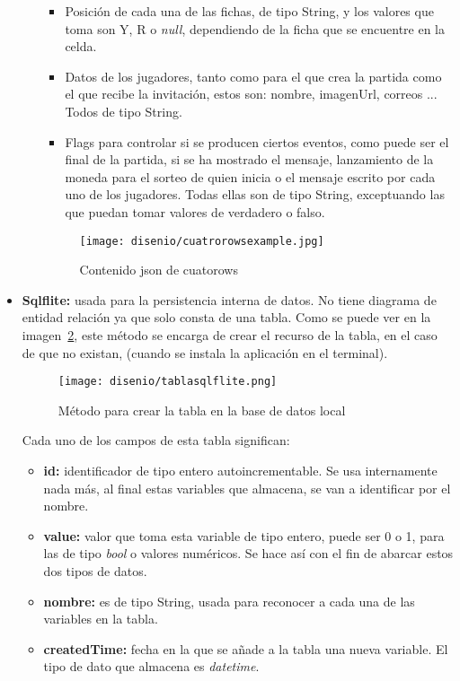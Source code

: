 \begin{itemize}
\begin{itemize}
		\begin{itemize}
			\item Posición de cada una de las fichas, de tipo String, y los valores que toma son Y, R o \emph{null}, dependiendo de la ficha que se encuentre en la celda.
			\item Datos de los jugadores, tanto como para el que crea la partida como el que recibe la invitación, estos son: nombre, imagenUrl, correos ... Todos de tipo String.
			\item Flags para controlar si se producen ciertos eventos, como puede ser el final de la partida, si se ha mostrado el mensaje, lanzamiento de la moneda para el sorteo de quien inicia o el mensaje escrito por cada uno de los jugadores. Todas ellas son de tipo String, exceptuando las que puedan tomar valores de verdadero o falso.
		\end{itemize}
	
		\begin{figure}[H]
			\centering
			\texttt{[image: disenio/cuatrorowsexample.jpg]}
			\caption{Contenido json de cuatorows}\label{fig:cuatrorowsexample}
		\end{figure}
	\end{itemize}
	
	\item \textbf{Sqlflite:} usada para la persistencia interna de datos. No tiene diagrama de entidad relación ya que solo consta de una tabla. Como se puede ver en la imagen~\ref{fig:tablasqlflite}, este método se encarga de crear el recurso de la tabla, en el caso de que no existan, (cuando se instala la aplicación en el terminal).
	
	\begin{figure}[H]
		\centering
		\texttt{[image: disenio/tablasqlflite.png]}
		\caption{Método para crear la tabla en la base de datos local}\label{fig:tablasqlflite}
	\end{figure}

	Cada uno de los campos de esta tabla significan:
	\begin{itemize}
		\item \textbf{id:} identificador de tipo entero autoincrementable. Se usa internamente nada más, al final estas variables que almacena, se van a identificar por el nombre.
		\item \textbf{value:} valor que toma esta variable de tipo entero, puede ser 0 o 1, para las de tipo \emph{bool} o valores numéricos. Se hace así con el fin de abarcar estos dos tipos de datos.
		\item \textbf{nombre:} es de tipo String, usada para reconocer a cada una de las variables en la tabla.
		\item \textbf{createdTime:} fecha en la que se añade a la tabla una nueva variable. El tipo de dato que almacena es \emph{datetime}.
	\end{itemize}


\end{itemize}
